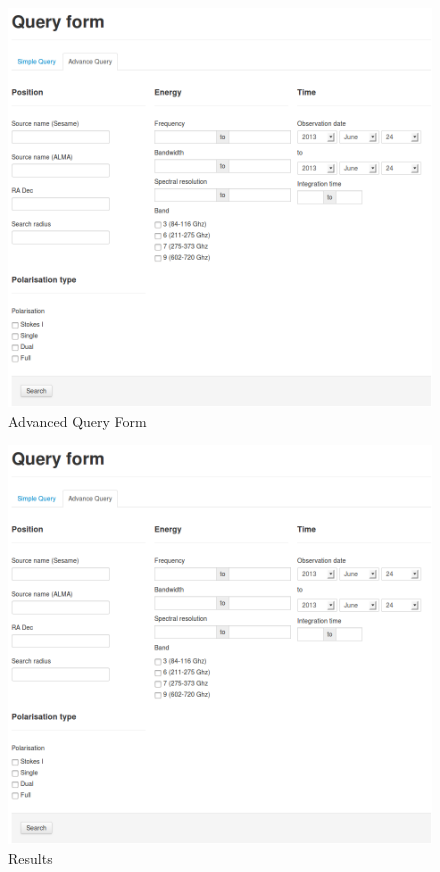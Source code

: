 \begin{figure}[h!t]
         \begin{center}
                 \includegraphics[width=0.8\textheight]{img/snap2.png}
                 \caption{Advanced Query Form}
         \end{center}
\end{figure}

\newpage

\begin{figure}[h!t]
         \begin{center}
                 \includegraphics[width=0.8\textheight]{img/snap2.png}
                 \caption{Results}
         \end{center}
\end{figure}
